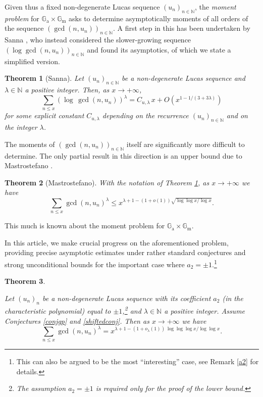 \documentclass[12pt,a4paper,oneside]{amsart}
\newtheorem{theorem}{Theorem}[section]
\begin{document}
 Given thus a fixed non-degenerate Lucas sequence $(u_n)_{n \in \mathbb N}$, the \emph{moment problem} for $\mathbb G_{\mathrm{a}} \times \mathbb G_{\mathrm{m}}$ asks to determine asymptotically moments of all orders of the sequence $(\gcd(n,u_n))_{n \in \mathbb N}$. A first step in this has been undertaken by Sanna \cite[Th. 1.1]{Sa18}, who instead considered the slower-growing sequence $(\log \gcd(n,u_n))_{n \in \mathbb N}$ and found its asymptotics, of which we state a simplified version.
\begin{theorem}[Sanna]\label{sanna}
Let $(u_n)_{n \in \mathbb N}$ be a non-degenerate Lucas sequence and $\lambda \in \mathbb N$ a positive integer. Then, as $x \rightarrow +\infty$,
\[ \sum_{n \leq x} (\log\,\gcd(n,u_n))^\lambda = C_{u,\lambda}\,x+O\left(x^{1-1/(3+3\lambda)}\right) \]
for some explicit constant $C_{u,\lambda}$ depending on the recurrence $(u_n)_{n \in \mathbb N}$ and on the integer $\lambda$.
\end{theorem}

The moments of $(\gcd(n,u_n))_{n \in \mathbb N}$ itself are significantly more difficult to determine. The only partial result in this direction is an upper bound due to Mastrostefano \cite[Th. 1.3]{Ma19}.

\begin{theorem}[Mastrostefano]
With the notation of Theorem \ref{sanna}, as $x \rightarrow +\infty$ we have
\[ \sum_{n \leq x} \gcd(n,u_n)^\lambda \leq x^{\lambda+1-(1+o(1))\sqrt{\log\log x /\log x}}   .\]
\end{theorem}

This much is known about the moment problem for $\mathbb G_{\mathrm{a}} \times \mathbb G_{\mathrm{m}}$.

{In this article, we make crucial progress on the aforementioned problem, providing precise asymptotic estimates under rather standard conjectures and strong unconditional bounds for the important case where $a_2 = \pm 1$.\footnote{ This can also be argued to be the most ``interesting'' case, see Remark \ref{a2} for details.} }


\begin{theorem}\label{maincond}

Let $(u_n)_n$ be a non-degenerate Lucas sequence  with its coefficient $a_2$ (in the characteristic polynomial) equal to $\pm 1$,\footnote{ The assumption $a_2=\pm  1$ is required only for the proof of the lower bound.} and $\lambda \in \mathbb N$ a positive integer. Assume Conjectures \ref{conjgp} and \ref{shiftedconj}. Then as $x \rightarrow +\infty$ we have
\begin{equation}\label{maincondeq}
\sum_{n \leq x} \gcd(n,u_n)^\lambda = x^{\lambda+1-(1+o_{\lambda}(1))\,\log\log\log x/\log\log x}.
\end{equation}
\end{theorem}
\end{document}
